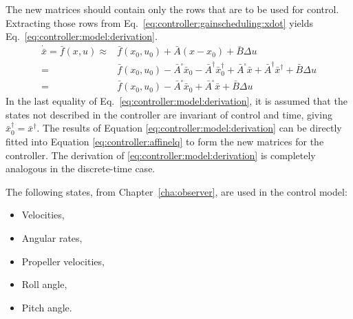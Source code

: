     The new matrices should contain only the rows that are to be used
    for control. Extracting those rows from Eq.~\eqref{eq:controller:gainscheduling:xdot}
    yields Eq.~\eqref{eq:controller:model:derivation}.
    \begin{equation}
        \label{eq:controller:model:derivation}
        \begin{array}{rl}
             \dot{\bar{x}} = \bar{f}(x,u) \approx & \bar{f}(x_{0},u_{0}) + \bar{A}(x - x_{0}) + \bar{B}\Delta u \\
             = & \bar{f}(x_{0},u_{0}) - \bar{A}^{\square}\bar{x}_{0} - \bar{A}^{\dagger}\bar{x}^{\dagger}_{0} + \bar{A}^{\square}\bar{x} + \bar{A}^{\dagger}\bar{x}^{\dagger} + \bar{B}\Delta u \\
             = & \bar{f}(x_{0},u_{0}) - \bar{A}^{\square}\bar{x}_{0} + \bar{A}^{\square}\bar{x} + \bar{B}\Delta u
        \end{array}
    \end{equation}
    In the last equality of Eq.~\eqref{eq:controller:model:derivation}, it
    is assumed that the states not described in the controller are invariant
    of control and time, giving $\bar{x}^{\dagger}_{0} = \bar{x}^{\dagger}$.
    The results of Equation \eqref{eq:controller:model:derivation} can be
    directly fitted into Equation \eqref{eq:controller:affinelq} to form
    the new matrices for the controller.
    The derivation of \eqref{eq:controller:model:derivation} is
    completely analogous in the discrete-time case.

    The following states, from Chapter~\ref{cha:observer}, are used in the control model:
    \begin{itemize}
        \item Velocities,
        \item Angular rates,
        \item Propeller velocities,
        \item Roll angle,
        \item Pitch angle.
    \end{itemize}
